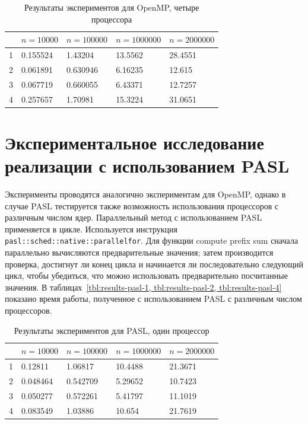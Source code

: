 \documentclass[specification,annotation]{itmo-student-thesis}
\begin{document}
\begin{table}[!ht]
\centering
\begin{tabular}{|l|l|l|l|l|}\hline
 & $n=10000$ & $n=100000$ & $n=1000000$ & $n=2000000$ \\\hline
1 & 0.155524 & 1.43204 & 13.5562 & 28.4551 \\\hline
2 & 0.061891 & 0.630946 & 6.16235 & 12.615 \\\hline
3 & 0.067719 & 0.660055 & 6.43371 & 12.7257 \\\hline
4 & 0.257657 & 1.70981 & 15.3224 & 31.0651 \\\hline
\end{tabular}
\caption{Результаты экспериментов для OpenMP, четыре процессора}\label{tbl:results-openmp-4}
\end{table}

\section{Экспериментальное исследование реализации с использованием PASL}

Эксперименты проводятся аналогично экспериментам для OpenMP, однако в случае PASL тестируется также возможность использования процессоров с различным числом ядер. 
Параллельный метод с использованием PASL применяется в цикле. Используется инструкция \texttt{pasl::sched::native::parallel{\textunderscore}for}. Для функции compute prefix sum сначала параллельно вычисляются предварительные значения; затем производится проверка, достигнут ли конец цикла и начинается ли последовательно следующий цикл, чтобы убедиться, что можно использовать предварительно посчитанные значения. В таблицах~\ref{tbl:results-pasl-1, tbl:results-pasl-2, tbl:results-pasl-4} показано время работы, полученное с использованием PASL с различным числом процессоров.

\begin{table}[!ht]
\centering
\begin{tabular}{|l|l|l|l|l|}\hline
 & $n=10000$ & $n=100000$ & $n=1000000$ & $n=2000000$ \\\hline
1 & 0.12811 & 1.06817 & 10.4488 & 21.3671 \\\hline
2 & 0.048464 & 0.542709 & 5.29652 & 10.7423 \\\hline
3 & 0.050277 & 0.572261 & 5.41797 & 11.1019 \\\hline
4 & 0.083549 & 1.03886 & 10.654 & 21.7619 \\\hline
\end{tabular}
\caption{Результаты экспериментов для PASL, один процессор}\label{tbl:results-pasl-1}
\end{table}
\end{document}
